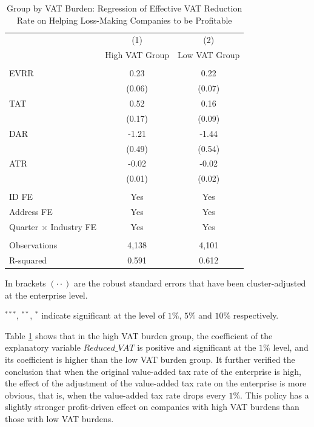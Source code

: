 \documentclass[3p,times]{elsarticle}
\begin{document}
\begin{table}[htp!]
    \centering
    \caption{Group by VAT Burden: Regression of Effective VAT Reduction Rate on Helping Loss-Making Companies to be Profitable}
    \begin{threeparttable}
    \begin{tabular}{lcc}&\\ 
        \toprule\toprule
        
        & (1) & (2)\\
        &High VAT Group & Low VAT Group\\
        \hline
        &  &    \\
        EVRR&0.23\tnote{***}&	0.22\tnote{***}\\
        &(0.06)&	(0.07)\\
        TAT&0.52\tnote{***}&	0.16\tnote{*}\\
        &(0.17)&	(0.09)
        \\
        DAR&-1.21\tnote{**}&	-1.44\tnote{***}\\
        &(0.49)&	(0.54)
        \\
        ATR&-0.02&	-0.02\\
        &(0.01)	&(0.02)\\
        
          &  &   \\
        ID FE & Yes & Yes  \\
        Address FE & Yes & Yes  \\
        Quarter $\times$ Industry FE & Yes & Yes  \\
         &  &    \\
        
        Observations& 4,138	&4,101
         \\
        R-squared &0.591&	0.612	\\
        \bottomrule
    \end{tabular}
    \begin{tablenotes}
        \item In brackets $(\cdot\cdot)$ are the robust standard errors that have been cluster-adjusted at the enterprise level.
        \item $^{***}$, $^{**}$, $^{*}$ indicate significant at the level of $1\%$, $5\%$ and $10\%$ respectively.
    \end{tablenotes}
    \end{threeparttable}
    \label{tab:tax_burden}
\end{table}
Table \ref{tab:tax_burden} shows that in the high VAT burden group, the coefficient of the explanatory variable $Reduced\_VAT$ is positive and significant at the $1\%$ level, and its coefficient is higher than the low VAT burden group. It further verified the conclusion that when the original value-added tax rate of the enterprise is high, the effect of the adjustment of the value-added tax rate on the enterprise is more obvious, that is, when the value-added tax rate drops every $1\%$. This policy has a slightly stronger profit-driven effect on companies with high VAT burdens than those with low VAT burdens.
\end{document}
